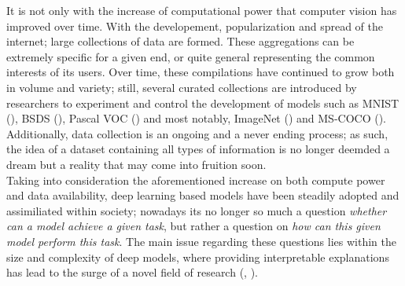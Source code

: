 \noindent It is not only with the increase of computational power that computer vision has improved over time. 
With the developement, popularization and spread of the internet; large collections of data are 
formed. These aggregations can be extremely specific for a given end, or 
quite general representing the common interests of its users. Over time, these compilations have 
continued to grow both in volume and variety; still, several curated collections are introduced by 
researchers to experiment and control the development of models such as MNIST (\cite{lecun1998gradient}),
BSDS (\cite{MartinFTM01}), Pascal VOC (\cite{pascal-voc-2012}) and most notably, 
ImageNet (\cite{ILSVRC15}) and MS-COCO (\cite{lin2014microsoft}). Additionally, data collection is
an ongoing and a never ending process; as such, the idea of a dataset containing all types of 
information is no longer deemded a dream but a reality that may come into fruition soon.\\

\noindent Taking into consideration the aforementioned  increase on  both compute power and data 
availability, deep learning based models have been steadily adopted and assimiliated within society; 
nowadays its no longer so much a question \textit{whether can a model achieve a given task}, but 
rather a question on \textit{how can this given model perform this task}. The main issue regarding 
these questions lies within the size and complexity of deep models, where providing interpretable 
explanations has lead to the surge of a novel field of research (\cite{guidotti2018survey}, 
\cite{bodria2021benchmarking}).

